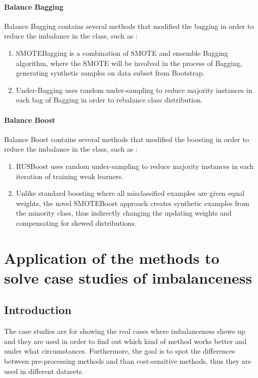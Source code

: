 \subsubsection{Balance Bagging} 
Balance Bagging contains several methods that modified the bagging in order to reduce the imbalance in the class, such as : 
\begin{enumerate}
\item{ SMOTEBagging is a combination of SMOTE and ensemble Bagging algorithm, where the SMOTE will be involved in the process of Bagging, generating synthetic samples on data subset from Bootstrap. } 
\item{ Under-Bagging uses random under-sampling to reduce majority instances in each bag of Bagging in order to rebalance class distribution.}  
\end{enumerate} 
 
\subsubsection{Balance Boost} 
Balance Boost contains several methods that modified the boosting in order to reduce the imbalance in the class, such as :  
\begin{enumerate}
\item{RUSBoost uses random under-sampling to reduce majority instances in each iteration of training weak learners.} 

\item{Unlike standard boosting where all misclassified examples are given equal weights, the novel SMOTEBoost approach creates synthetic examples from the minority class, thus indirectly changing the updating weights and compensating for skewed distributions.}
\end{enumerate} 

\chapter{Application of the methods to solve case studies of imbalanceness }
\section{Introduction}
The case studies are for showing the real cases where imbalanceness shows up and they are used in order to find out which kind of method works better and under what circumstances. Furthermore, the goal is to spot the differences between pre-processing methods and than cost-sensitive methods, thus they are used in different datasets.

